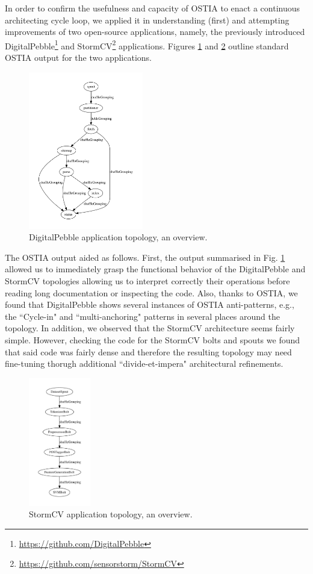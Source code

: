 In order to confirm the usefulness and capacity of OSTIA to enact a continuous architecting cycle loop, we applied it in understanding (first) and attempting improvements of two open-source applications, namely, the previously introduced DigitalPebble\footnote{\url{https://github.com/DigitalPebble}} and StormCV\footnote{\url{https://github.com/sensorstorm/StormCV}} applications. Figures \ref{dp} and \ref{scv} outline standard OSTIA output for the two applications.

\begin{figure}
\begin{center}
		\includegraphics[width=5cm]{images/output/crawl}
		\caption{DigitalPebble application topology, an overview.}
		\label{dp}
		\end{center}
\end{figure}

The OSTIA output aided as follows. First, the output summarised in Fig. \ref{dp} allowed us to immediately grasp the functional behavior of the DigitalPebble and StormCV topologies allowing us to interpret correctly their operations before reading long documentation or inspecting the code. Also, thanks to OSTIA, we found that DigitalPebble shows several instances of OSTIA anti-patterns, e.g., the ``Cycle-in" and ``multi-anchoring" patterns in several places around the topology. In addition, we observed that the StormCV architecture seems fairly simple. However, checking the code for the StormCV bolts and spouts we found that said code was fairly dense and therefore the resulting topology may need fine-tuning thorugh additional ``divide-et-impera" architectural refinements.

\begin{figure}
\begin{center}
		\includegraphics[width=2.7cm]{images/output/senti_storm}
		\caption{StormCV application topology, an overview.}
		\label{scv}
\end{center}
\end{figure}


